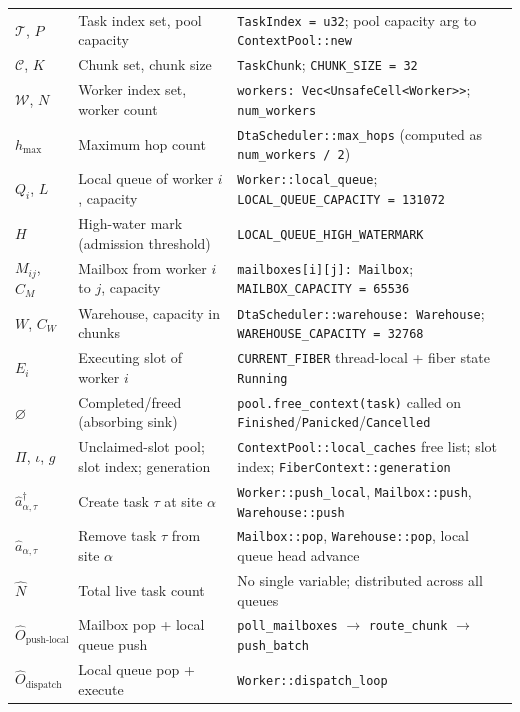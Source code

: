 \documentclass[11pt,a4paper]{report}
\newcommand{\cre}[1]{\hat{a}^{\dagger}_{#1}}
\newcommand{\ann}[1]{\hat{a}_{#1}}
\newcommand{\Num}{\hat{N}}
\newcommand{\code}[1]{\texttt{#1}}
\begin{document}
\begin{longtable}{>{\ttfamily}p{3.4cm} p{4.5cm} p{5.5cm}}
$\mathcal{T}$, $P$   & Task index set, pool capacity
  & \code{TaskIndex = u32}; pool capacity arg to \code{ContextPool::new} \\
$\mathcal{C}$, $K$   & Chunk set, chunk size
  & \code{TaskChunk}; \code{CHUNK\_SIZE = 32} \\
$\mathcal{W}$, $N$   & Worker index set, worker count
  & \code{workers: Vec<UnsafeCell<Worker>>}; \code{num\_workers} \\
$h_{\max}$           & Maximum hop count
  & \code{DtaScheduler::max\_hops} (computed as \code{num\_workers / 2}) \\
$Q_i$, $L$           & Local queue of worker $i$, capacity
  & \code{Worker::local\_queue}; \code{LOCAL\_QUEUE\_CAPACITY = 131072} \\
$H$                  & High-water mark (admission threshold)
  & \code{LOCAL\_QUEUE\_HIGH\_WATERMARK} \\
$M_{ij}$, $C_M$      & Mailbox from worker $i$ to $j$, capacity
  & \code{mailboxes[i][j]: Mailbox}; \code{MAILBOX\_CAPACITY = 65536} \\
$W$, $C_W$           & Warehouse, capacity in chunks
  & \code{DtaScheduler::warehouse: Warehouse}; \code{WAREHOUSE\_CAPACITY = 32768} \\
$E_i$                & Executing slot of worker $i$
  & \code{CURRENT\_FIBER} thread-local + fiber state \code{Running} \\
$\varnothing$        & Completed/freed (absorbing sink)
  & \code{pool.free\_context(task)} called on \code{Finished}/\code{Panicked}/\code{Cancelled} \\
$\Pi$, $\iota$, $g$  & Unclaimed-slot pool; slot index; generation
  & \code{ContextPool::local\_caches} free list; slot index; \code{FiberContext::generation} \\
$\cre{\alpha,\tau}$  & Create task $\tau$ at site $\alpha$
  & \code{Worker::push\_local}, \code{Mailbox::push}, \code{Warehouse::push} \\
$\ann{\alpha,\tau}$  & Remove task $\tau$ from site $\alpha$
  & \code{Mailbox::pop}, \code{Warehouse::pop}, local queue head advance \\
$\Num$               & Total live task count
  & No single variable; distributed across all queues \\
$\hat{O}_{\text{push-local}}$ & Mailbox pop + local queue push
  & \code{poll\_mailboxes} $\to$ \code{route\_chunk} $\to$ \code{push\_batch} \\
$\hat{O}_{\text{dispatch}}$   & Local queue pop + execute
  & \code{Worker::dispatch\_loop} \\

\end{longtable}
\end{document}
